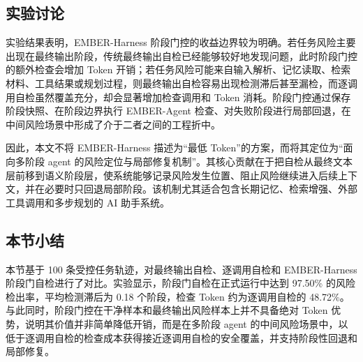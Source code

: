 \subsection{实验讨论}

实验结果表明，EMBER-Harness 阶段门控的收益边界较为明确。若任务风险主要出现在最终输出阶段，传统最终输出自检已经能够较好地发现问题，此时阶段门控的额外检查会增加 Token 开销；若任务风险可能来自输入解析、记忆读取、检索材料、工具结果或规划过程，则最终输出自检容易出现检测滞后甚至漏检，而逐调用自检虽然覆盖充分，却会显著增加检查调用和 Token 消耗。阶段门控通过保存阶段快照、在阶段边界执行 EMBER-Agent 检查、对失败阶段进行局部回退，在中间风险场景中形成了介于二者之间的工程折中。

因此，本文不将 EMBER-Harness 描述为“最低 Token”的方案，而将其定位为“面向多阶段 agent 的风险定位与局部修复机制”。其核心贡献在于把自检从最终文本层前移到语义阶段层，使系统能够记录风险发生位置、阻止风险继续进入后续上下文，并在必要时只回退局部阶段。该机制尤其适合包含长期记忆、检索增强、外部工具调用和多步规划的 AI 助手系统。

\subsection{本节小结}

本节基于 100 条受控任务轨迹，对最终输出自检、逐调用自检和 EMBER-Harness 阶段门自检进行了对比。实验显示，阶段门自检在正式运行中达到 97.50\% 的风险检出率，平均检测滞后为 0.18 个阶段，检查 Token 约为逐调用自检的 48.72\%。与此同时，阶段门控在干净样本和最终输出风险样本上并不具备绝对 Token 优势，说明其价值并非简单降低开销，而是在多阶段 agent 的中间风险场景中，以低于逐调用自检的检查成本获得接近逐调用自检的安全覆盖，并支持阶段性回退和局部修复。
